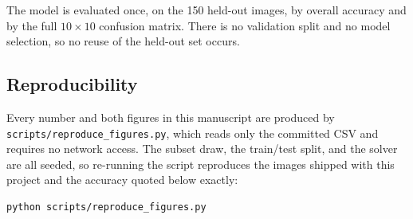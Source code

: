 The model is evaluated once, on the 150 held-out images, by overall accuracy
and by the full $10\times10$ confusion matrix. There is no validation split and
no model selection, so no reuse of the held-out set occurs.

\subsection{Reproducibility}

Every number and both figures in this manuscript are produced by
\texttt{scripts/reproduce\_figures.py}, which reads only the committed CSV and
requires no network access. The subset draw, the train/test split, and the
solver are all seeded, so re-running the script reproduces the images shipped
with this project and the accuracy quoted below exactly:

\begin{verbatim}
python scripts/reproduce_figures.py
\end{verbatim}

